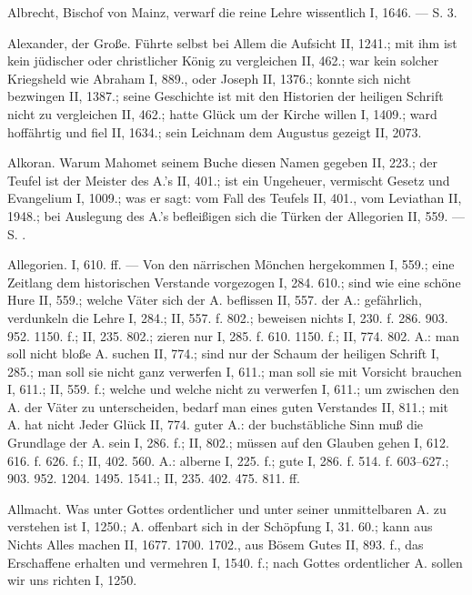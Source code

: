 Albrecht, Bischof von Mainz, verwarf die reine Lehre wissentlich I, 1646. — S.  3.

Alexander, der Große. Führte selbst bei Allem die Aufsicht II, 1241.; mit ihm ist kein jüdischer oder christlicher König zu vergleichen II, 462.; war kein solcher Kriegsheld wie Abraham I, 889., oder Joseph II, 1376.; konnte sich nicht bezwingen II, 1387.; seine Geschichte ist mit den Historien der heiligen Schrift nicht zu vergleichen II, 462.; hatte Glück um der Kirche willen I, 1409.; ward hoffährtig und fiel II, 1634.; sein Leichnam dem Augustus gezeigt II, 2073.

Alkoran. Warum Mahomet seinem Buche diesen Namen gegeben II, 223.; der Teufel ist der Meister des A.’s II, 401.; ist ein Ungeheuer, vermischt Gesetz und Evangelium I, 1009.; was er sagt: vom Fall des Teufels II, 401., vom Leviathan II, 1948.; bei Auslegung des A.’s befleißigen sich die Türken der Allegorien II, 559. — S. .

Allegorien. I, 610. ff. — Von den närrischen Mönchen hergekommen I, 559.; eine Zeitlang dem historischen Verstande vorgezogen I, 284. 610.; sind wie eine schöne Hure II, 559.; welche Väter sich der A. beflissen II, 557.  der A.: gefährlich, verdunkeln die Lehre I, 284.; II, 557. f. 802.; beweisen nichts I, 230. f. 286. 903. 952. 1150. f.; II, 235. 802.; zieren nur I, 285. f. 610. 1150. f.; II, 774. 802.  A.: man soll nicht bloße A. suchen II, 774.; sind nur der Schaum der heiligen Schrift I, 285.; man soll sie nicht ganz verwerfen I, 611.; man soll sie mit Vorsicht brauchen I, 611.; II, 559. f.; welche und welche nicht zu verwerfen I, 611.; um zwischen den A. der Väter zu unterscheiden, bedarf man eines guten Verstandes II, 811.; mit A. hat nicht Jeder Glück II, 774.  guter A.: der buchstäbliche Sinn muß die Grundlage der A. sein I, 286. f.; II, 802.; müssen auf den Glauben gehen I, 612. 616. f. 626. f.; II, 402. 560.  A.: alberne I, 225. f.; gute I, 286. f. 514. f. 603–627.; 903. 952. 1204. 1495. 1541.; II, 235. 402. 475. 811. ff.

Allmacht. Was unter Gottes ordentlicher und unter seiner unmittelbaren A. zu verstehen ist I, 1250.; A. offenbart sich in der Schöpfung I, 31. 60.; kann aus Nichts Alles machen II, 1677. 1700. 1702., aus Bösem Gutes II, 893. f., das Erschaffene erhalten und vermehren I, 1540. f.; nach Gottes ordentlicher A. sollen wir uns richten I, 1250.

